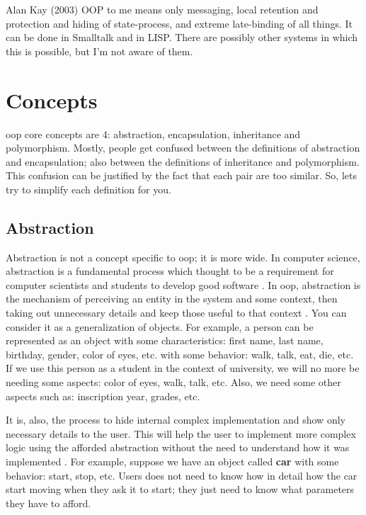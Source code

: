 \documentclass[12pt]{KodeBookAr}
\begin{document}
\begin{kodequote}{Alan Kay (2003)}
	OOP to me means only messaging, local retention and protection and hiding of state-process, and extreme late-binding of all things. 
	It can be done in Smalltalk and in LISP. 
	There are possibly other systems in which this is possible, but I'm not aware of them.
\end{kodequote}




\section{Concepts}

\ac{oop} core concepts are 4: abstraction, encapsulation, inheritance and polymorphism. 
Mostly, people get confused between the definitions of abstraction and encapsulation; also between the definitions of inheritance and polymorphism. 
This confusion can be justified by the fact that each pair are too similar. 
So, lets try to simplify each definition for you.

\subsection{Abstraction}

Abstraction is not a concept specific to \ac{oop}; it is more wide. 
In computer science, abstraction is a fundamental process which thought to be a requirement for computer scientists and students to develop good software \citep{2013-saitta-zucker}.
In \ac{oop}, abstraction is the mechanism of perceiving an entity in the system and some context, then taking out unnecessary details and keep those useful to that context \citep{2014-rahman}.
You can consider it as a generalization of objects.
For example, a person can be represented as an object with some characteristics: first name, last name, birthday, gender, color of eyes, etc. with some behavior: walk, talk, eat, die, etc. 
If we use this person as a student in the context of university, we will no more be needing some aspects: color of eyes, walk, talk, etc. 
Also, we need some other aspects such as: inscription year, grades, etc. 

It is, also, the process to hide internal complex implementation and show only necessary details to the user. 
This will help the user to implement more complex logic using the afforded abstraction without the need to understand how it was implemented \citep{2017-janssen}.
For example, suppose we have an object called \textbf{car} with some behavior: start, stop, etc. 
Users does not need to know how in detail how the car start moving when they ask it to start; they just need to know what parameters they have to afford.
\end{document}
